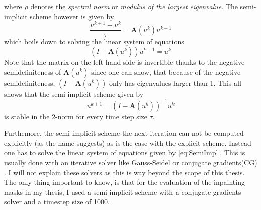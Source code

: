where $\rho$ denotes the \textit{spectral norm} or \textit{modulus of the largest
eigenvalue}.\cite{www13}
The semi-implicit scheme however is given by
\begin{equation}
    \frac{u^{k+1} - u^{k}}{\tau} = \mathbf{A}(u^k)u^{k+1}
\end{equation}
which boils down to solving the linear system of equations
\begin{equation}
    (I-\mathbf{A}(u^k))u^{k+1} = u^k\label{eq:SemiImpl}
\end{equation}
Note that the matrix on the left hand side is invertible thanks to the negative semidefiniteness of
$\mathbf{A}(u^k)$ since one can show, that because of the negative semidefiniteness, $(I-\mathbf{A}(u^k))$ only has eigenvalues
larger than 1.
This all shows that the semi-implicit scheme given by 
\begin{equation}
    u^{k+1} = (I- \mathbf{A}(u^k))^{-1}u^k
\end{equation}
is stable in the 2-norm for every time step size $\tau$.

Furthemore, the semi-implicit scheme the next iteration can not be computed explicitly (as the name
suggests) as is the case with the explicit scheme. Instead one has to solve
the linear system of equations given by \eqref{eq:SemiImpl}. This is usually done with an iterative
solver like Gauss-Seidel or conjugate gradients(CG) \cite{conjugateGradients}. I will not explain these solvers as this is way
beyond the scope of this thesis.
The only thing important to know, is that for the evaluation of the inpainting masks in my thesis,
I used a semi-implicit scheme with a conjugate gradients solver and a timestep size of 1000.

